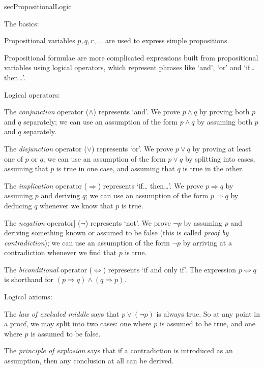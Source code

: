 \begin{tldr}{secPropositionalLogic}

The basics:

\begin{tldrlist}
Propositional variables $p,q,r,\dots$ are used to express simple propositions.

Propositional formulae are more complicated expressions built from propositional variables using logical operators, which represent phrases like `and', `or' and `if\dots{} then\dots{}'.
\end{tldrlist}

Logical operators:
\begin{tldrlist}
The \textit{conjunction} operator ($\wedge$) represents `and'. We prove $p \wedge q$ by proving both $p$ and $q$ separately; we can use an assumption of the form $p \wedge q$ by assuming both $p$ and $q$ separately.

The \textit{disjunction} operator ($\vee$) represents `or'. We prove $p \vee q$ by proving at least one of $p$ or $q$; we can use an assumption of the form $p \vee q$ by splitting into cases, assuming that $p$ is true in one case, and assuming that $q$ is true in the other.

The \textit{implication} operator ($\Rightarrow$) represents `if\dots{} then\dots{}'. We prove $p \Rightarrow q$ by assuming $p$ and deriving $q$; we can use an assumption of the form $p \Rightarrow q$ by deducing $q$ whenever we know that $p$ is true.

The \textit{negation} operator] ($\neg$) represents `not'. We prove $\neg p$ by assuming $p$ and deriving something known or assumed to be false (this is called \textit{proof by contradiction}); we can use an assumption of the form $\neg p$ by arriving at a contradiction whenever we find that $p$ is true.

The \textit{biconditional} operator ($\Leftrightarrow$) represents `if and only if'. The expression $p \Leftrightarrow q$ is shorthand for $(p \Rightarrow q) \wedge (q \Rightarrow p)$.
\end{tldrlist}

Logical axioms:

\begin{tldrlist}
The \textit{law of excluded middle} says that $p \vee (\neg p)$ is always true. So at any point in a proof, we may split into two cases: one where $p$ is assumed to be true, and one where $p$ is assumed to be false.

The\textit{ principle of explosion} says that if a contradiction is introduced as an assumption, then any conclusion at all can be derived.
\end{tldrlist}
\end{tldr}
